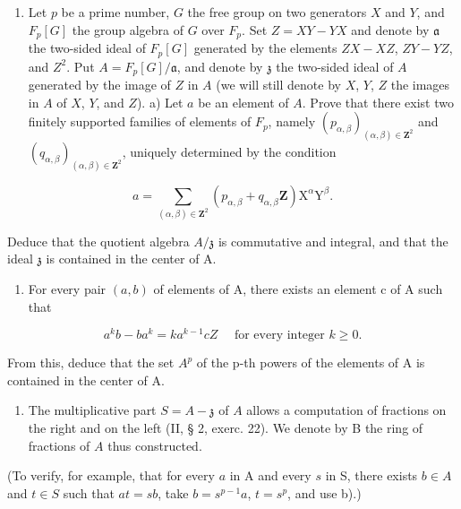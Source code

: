 \begin{enumerate}
\def\labelenumi{\arabic{enumi})}
\tightlist
\item
  Let \(p\) be a prime number, \(G\) the free group on two generators \(X\) and \(Y\), and \(F_p[G]\) the group algebra of \(G\) over \(F_p\). Set \(Z = XY - YX\) and denote by \(\mathfrak{a}\) the two-sided ideal of \(F_p[G]\) generated by the elements \(ZX - XZ\), \(ZY - YZ\), and \(Z^2\). Put \(A = F_p[G]/\mathfrak{a}\), and denote by \(\mathfrak{z}\) the two-sided ideal of \(A\) generated by the image of \(Z\) in \(A\) (we will still denote by \(X\), \(Y\), \(Z\) the images in \(A\) of \(X\), \(Y\), and \(Z\)). a) Let \(a\) be an element of \(A\). Prove that there exist two finitely supported families of elements of \(F_p\), namely \((p_{\alpha,\beta})_{(\alpha,\beta)\in\mathbf{Z}^2}\) and \((q_{\alpha,\beta})_{(\alpha,\beta)\in\mathbf{Z}^2}\), uniquely determined by the condition
\end{enumerate}

\[
a = \sum_ {(\alpha , \beta) \in \mathbf {Z} ^ {2}} (p _ {\alpha , \beta} + q _ {\alpha , \beta} \mathbf {Z}) \mathrm{X} ^ {\alpha} \mathrm{Y} ^ {\beta}.
\]

Deduce that the quotient algebra \(A/\mathfrak{z}\) is commutative and integral, and that the ideal \(\mathfrak{z}\) is contained in the center of A.

\begin{enumerate}
\def\labelenumi{\alph{enumi})}
\setcounter{enumi}{1}
\tightlist
\item
  For every pair \((a, b)\) of elements of A, there exists an element c of A such that
\end{enumerate}

\[
  a ^ {k} b - b a ^ {k} = k a ^ {k - 1} c Z \quad \text { for every integer } k \geqslant 0.
\]

From this, deduce that the set \(A^{p}\) of the p-th powers of the elements of A is contained in the center of A.

\begin{enumerate}
\def\labelenumi{\alph{enumi})}
\setcounter{enumi}{2}
\tightlist
\item
  The multiplicative part \(S = A - \mathfrak{z}\) of \(A\) allows a computation of fractions on the right and on the left (II, § 2, exerc. 22). We denote by B the ring of fractions of \(A\) thus constructed.
\end{enumerate}

(To verify, for example, that for every \(a\) in A and every \(s\) in S, there exists \(b \in A\) and \(t \in S\) such that \(at = sb\), take \(b = s^{p-1}a\), \(t = s^p\), and use b).)

